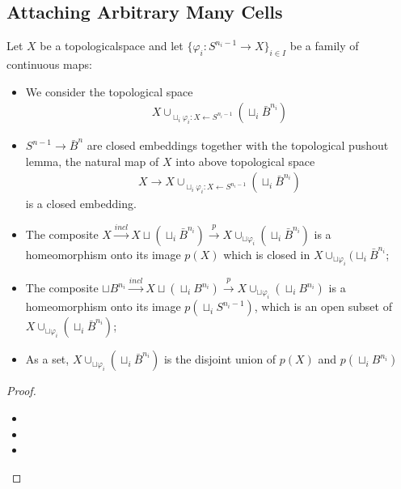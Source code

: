 \documentclass[Total.tex]{subfiles}
\begin{document}
	\subsection{Attaching Arbitrary Many Cells}
	\begin{Def}
		Let $X$ be a topologicalspace and let $\{\varphi_i:S^{n_i-1}\rightarrow X\}_{i\in I}$ be a family of continuous maps:
		\begin{itemize}
			\item We consider the topological space
			\begin{gather*}
				X\cup_{\sqcup_i \varphi_i:X\leftarrow S^{n_i-1}} (\sqcup_i \bar{B}^{n_i})
			\end{gather*}
			\item $S^{n-1}\rightarrow\bar{B}^n$ are closed embeddings together with the topological pushout lemma, the natural map of $X$ into above topological space
			\begin{gather*}
				X\rightarrow X\cup_{\sqcup_i \varphi_i:X\leftarrow S^{n_i-1}} (\sqcup_i \bar{B}^{n_i})
			\end{gather*}
			is a closed embedding. 
		\end{itemize}
	\end{Def}
	\begin{lemma}
		\begin{itemize}
			\item The composite $X\stackrel{incl}{\rightarrow} X\sqcup (\sqcup_i \bar{B}^{n_i}) \stackrel{p}{\rightarrow} X\cup_{\sqcup\varphi_i} (\sqcup_i \bar{B}^{n_i})$ is a homeomorphism onto its image $p(X)$ which is closed in $X\cup_{\sqcup\varphi_i} (\sqcup_i \bar{B}^{n_i}$;
			\item The composite $\sqcup B^{n_i}\stackrel{incl}{\rightarrow} X\sqcup (\sqcup_i B^{n_i})\stackrel{p}{\rightarrow} X\cup_{\sqcup\varphi_i} (\sqcup_i B^{n_i})$ is a homeomorphism onto its image $p(\sqcup_i S^{n_i-1})$, which is an open subset of $X\cup_{\sqcup\varphi_i} (\sqcup_i \bar{B}^{n_i})$;
			\item As a set, $X\cup_{\sqcup\varphi_i} (\sqcup_i \bar{B}^{n_i})$ is the disjoint union of $p(X)$ and $p(\sqcup_i B^{n_i})$
		\end{itemize}
	\end{lemma}
	\begin{proof}
		\begin{itemize}
			\item 
			\item 
			\item 
		\end{itemize}
	\end{proof}
\end{document}
